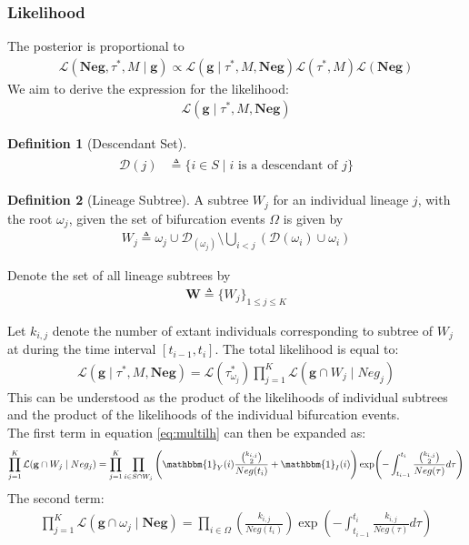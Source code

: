 \documentclass{report}
\theoremstyle{definition}
\newtheorem{definition}{Definition}[section]
\begin{document}
\subsubsection{Likelihood}
The posterior is proportional to
\begin{gather}
\mathcal{L}(\mathbf{Neg}, \tau^*, M\mid\mathbf{g}) \propto 
\mathcal{L}(\mathbf{g}\mid \tau^*, M, \mathbf{Neg})\mathcal{L}(\tau^*,M)\mathcal{L}(\mathbf{Neg})
\end{gather}
We aim to derive the expression for the likelihood: 
\begin{gather*}
\mathcal{L}(\mathbf{g}\mid \tau^*, M, \mathbf{Neg})
\end{gather*}
\begin{definition}[Descendant Set]
\begin{gather}
\begin{aligned}
\mathcal{D}(j) &\triangleq \{i\in S\mid i \text{ is a descendant of } j\}
\end{aligned}
\end{gather} 
\end{definition}

\begin{definition}[Lineage Subtree]
A subtree $W_j$ for an individual lineage $j$, with the root $\omega_j$,  given the set of bifurcation events $\Omega$ is given by 
\begin{gather}
W_j \triangleq \omega_j\cup\mathcal{D}_(\omega_j) \setminus \bigcup_{i<j}(\mathcal{D}(\omega_i)\cup\omega_i)
\end{gather} 
\end{definition}
Denote the set of all lineage subtrees by
\begin{gather}
\mathbf{W} \triangleq \{W_j\}_{1\leq j\leq K}
\end{gather}

Let $k_{i,j}$ denote the number of extant individuals corresponding to subtree of $W_j$ at during the time interval $[t_{i-1}, t_i]$.
The total likelihood is equal to:
\begin{gather}\label{eq:multilh}
\mathcal{L}(\mathbf{g}\mid \tau^*, M, \mathbf{Neg})
 = \mathcal{L}(\tau^*_{\omega_j})\prod_{j=1}^{K}\mathcal{L}(\mathbf{g}\cap W_j \mid Neg_j)
\end{gather}
This can be understood as the product of the likelihoods of individual subtrees and the product of the likelihoods of the individual bifurcation events.\\ 
The first term in equation \ref{eq:multilh} can then be expanded as:
\begin{gather}
\prod_{j=1}^{K}\mathcal{L}(\mathbf{g}\cap W_j \mid Neg_j) 
= \prod_{j=1}^{K}\prod_{i\in S\cap W_j}\left(\mathbbm{1}_Y(i)\frac{\binom{k_{i,j}}{2}}{Neg(t_i)}+\mathbbm{1}_I(i)\right)
\exp(-\int_{t_{i-1}}^{t_i}\frac{\binom{k_{i,j}}{2}}{Neg(\tau)}d\tau)
\end{gather}
The second term:
\begin{gather}
\prod_{j=1}^{K}\mathcal{L}(\mathbf{g}\cap \omega_j \mid \mathbf{Neg})
= \prod_{i\in\Omega}\left(\frac{k_{i,j}}{Neg(t_i)}\right)
\exp(-\int_{t_{i-1}}^{t_i}\frac{k_{i,j}}{Neg(\tau)}d\tau)
\end{gather} 
\end{document}
